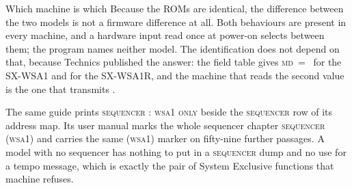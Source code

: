 \begin{note}{Which machine is which}
Because the ROMs are identical, the difference between the two models is not a firmware
difference at all. Both behaviours are present in every machine, and a hardware input read
once at power-on selects between them; the program names neither model. The identification does not depend on that, because Technics
published the answer: the field table gives \textsc{md}~=~ for the SX-WSA1 and
 for the SX-WSA1R, and the machine that reads the second value is the one that
transmits .

The same guide prints \textsc{sequencer : wsa1 only} beside the \textsc{sequencer} row of
its address map. Its user manual marks the whole sequencer chapter \textsc{sequencer
(wsa1)} and carries the same \textsc{(wsa1)} marker on fifty-nine further passages. A
model with no sequencer has nothing to put in a \textsc{sequencer} dump and no use for a
tempo message, which is exactly the pair of System Exclusive functions that machine
refuses.
\end{note}
